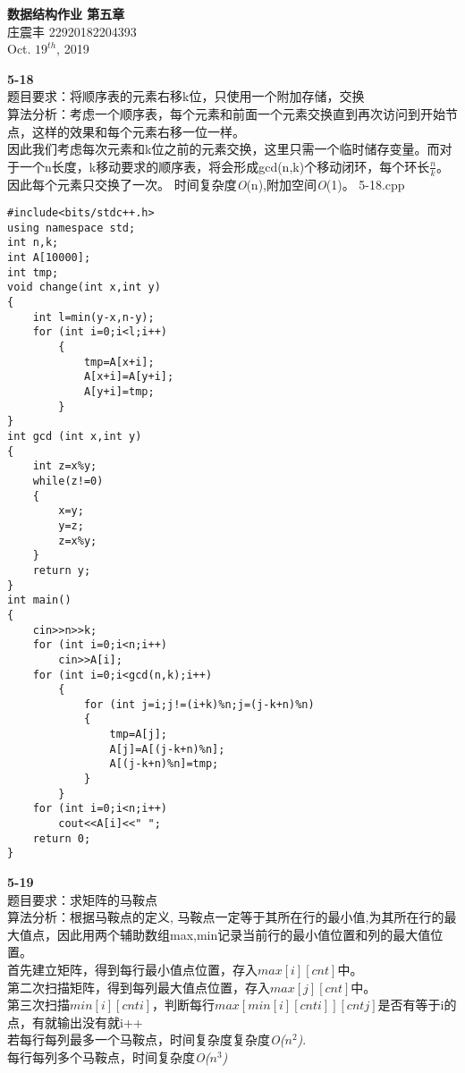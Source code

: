 \documentclass[UTF8,a4paper]{article}
\begin{document}
\begin{center}
    \textbf{\LARGE{数据结构作业 第五章}}\\[0.5cm]
    \normalsize{庄震丰 22920182204393}\\[0.3cm]
    \large{Oct. $19^{th}$, 2019}
\end{center}
\textbf{5-18}\\
    题目要求：将顺序表的元素右移k位，只使用一个附加存储，交换\\
    算法分析：考虑一个顺序表，每个元素和前面一个元素交换直到再次访问到开始节点，这样的效果和每个元素右移一位一样。\\
    因此我们考虑每次元素和k位之前的元素交换，这里只需一个临时储存变量。而对于一个n长度，k移动要求的顺序表，将会形成gcd(n,k)个移动闭环，每个环长$\frac{n}{k}$。因此每个元素只交换了一次。
    时间复杂度\textit{O}(n),附加空间\textit{O}(1)。
    5-18.cpp
\begin{lstlisting}
#include<bits/stdc++.h>
using namespace std;
int n,k;
int A[10000];
int tmp;
void change(int x,int y)
{
    int l=min(y-x,n-y);
    for (int i=0;i<l;i++)
        {   
            tmp=A[x+i];
            A[x+i]=A[y+i];
            A[y+i]=tmp;
        }
}
int gcd (int x,int y)
{
    int z=x%y;
    while(z!=0)
    {
        x=y;
        y=z;
        z=x%y;
    }
    return y;
}
int main()
{
    cin>>n>>k;
    for (int i=0;i<n;i++)
        cin>>A[i];
    for (int i=0;i<gcd(n,k);i++)
        {
            for (int j=i;j!=(i+k)%n;j=(j-k+n)%n)
            {
                tmp=A[j];
                A[j]=A[(j-k+n)%n];
                A[(j-k+n)%n]=tmp;
            }
        }
    for (int i=0;i<n;i++)
        cout<<A[i]<<" ";
    return 0;
}
\end{lstlisting}
\textbf{5-19}\\
    题目要求：求矩阵的马鞍点\\
     算法分析：根据马鞍点的定义, 马鞍点一定等于其所在行的最小值,为其所在行的最大值点，因此用两个辅助数组max,min记录当前行的最小值位置和列的最大值位置。\\
    首先建立矩阵，得到每行最小值点位置，存入$max[i][cnt]$中。\\
    第二次扫描矩阵，得到每列最大值点位置，存入$max[j][cnt]$中。\\
    第三次扫描$min[i][cnti]$，判断每行$max[min[i][cnti]][cntj]$是否有等于i的点，有就输出没有就i++\\
    若每行每列最多一个马鞍点，时间复杂度复杂度\textit{O($n^2$)}.\\
    每行每列多个马鞍点，时间复杂度\textit{O($n^3$)}\\
\end{document}
